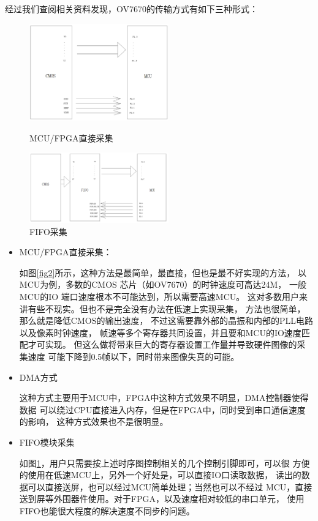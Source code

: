 \documentclass[a4paper]{paper}
\begin{document}
经过我们查阅相关资料发现，OV7670的传输方式有如下三种形式：
\begin{figure}
        \centering
        \includegraphics[width=60mm]{NFIFO.png}
        \caption{MCU/FPGA直接采集}
        \label{fig2}
        \includegraphics[width=60mm]{FIFO.png}
        \caption{FIFO采集}
        \label{fig3}
\end{figure}
\begin{itemize}
    \item MCU/FPGA直接采集：

    如图\ref{fig2}所示，这种方法是最简单，最直接，但也是最不好实现的方法，
    以MCU为例，多数的CMOS 芯片（如OV7670）的时钟速度可高达24M，
    一般MCU的IO 端口速度根本不可能达到，所以需要高速MCU。
    这对多数用户来讲有些不现实。但也不是完全没有办法在低速上实现采集，
    方法也很简单，那么就是降低CMOS的输出速度，
    不过这需要靠外部的晶振和内部的PLL电路以及像素时钟速度，
    帧速等多个寄存器共同设置，并且要和MCU的IO速度匹配才可实现。
    但这么做将带来巨大的寄存器设置工作量并导致硬件图像的采集速度
    可能下降到0.5帧以下，同时带来图像失真的可能。
\end{itemize} 

\begin{itemize}
    \item DMA方式

    这种方式主要用于MCU中，FPGA中这种方式效果不明显，DMA控制器使得数据
    可以绕过CPU直接进入内存，但是在FPGA中，同时受到串口通信速度的影响，
    这种方式效果也不是很明显。

    \item FIFO模块采集

    如图\ref{fig3}，用户只需要按上述时序图控制相关的几个控制引脚即可，可以很
    方便的使用在低速MCU上，另外一个好处是，可以直接IO口读取数据，
    读出的数据可以直接送屏，也可以经过MCU简单处理；当然也可以不经过
    MCU，直接送到屏等外围器件使用。对于FPGA，以及速度相对较低的串口单元，
    使用FIFO也能很大程度的解决速度不同步的问题。

\end{itemize}
\end{document}
